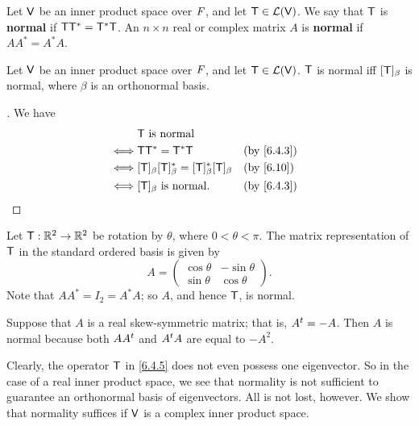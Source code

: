\begin{defn}\label{6.4.3}
	Let \(\mathsf{V}\) be an inner product space over \(\mathit{F}\), and let \(\mathsf{T} \in \mathcal{L}(\mathsf{V})\).
	We say that \(\mathsf{T}\) is \textbf{normal} if \(\mathsf{T} \mathsf{T}^* = \mathsf{T}^* \mathsf{T}\).
	An \(n \times n\) real or complex matrix \(A\) is \textbf{normal} if \(A A^* = A^* A\).
\end{defn}

\begin{cor}\label{6.4.4}
	Let \(\mathsf{V}\) be an inner product space over \(\mathit{F}\), and let \(\mathsf{T} \in \mathcal{L}(\mathsf{V})\).
	\(\mathsf{T}\) is normal iff \([\mathsf{T}]_{\beta}\) is normal, where \(\beta\) is an orthonormal basis.
\end{cor}

\begin{proof}[]
	We have
	\begin{align*}
		     & \T \text{ is normal}                                                      \\
		\iff & \T \T^* = \T^* \T                                         &  & \by{6.4.3} \\
		\iff & [\T]_{\beta} [\T]_{\beta}^* = [\T]_{\beta}^* [\T]_{\beta} &  & \by{6.10}  \\
		\iff & [\T]_{\beta} \text{ is normal}.                           &  & \by{6.4.3}
	\end{align*}
\end{proof}

\begin{eg}\label{6.4.5}
	Let \(\mathsf{T} : \mathbb{R}^2 \to \mathbb{R}^2\) be rotation by \(\theta\), where \(0 < \theta < \pi\).
	The matrix representation of \(\mathsf{T}\) in the standard ordered basis is given by
	\[
		A = \begin{pmatrix}
			\cos\theta & -\sin\theta \\
			\sin\theta & \cos\theta
		\end{pmatrix}.
	\]
	Note that \(A A^* = I_2 = A^* A\);
	so \(A\), and hence \(\mathsf{T}\), is normal.
\end{eg}

\begin{eg}\label{6.4.6}
	Suppose that \(A\) is a real skew-symmetric matrix;
	that is, \({A}^{t} = -A\).
	Then \(A\) is normal because both \(A {A}^{t}\) and \({A}^{t} A\) are equal to \(-A^2\).
\end{eg}

\begin{note}
	Clearly, the operator \(\mathsf{T}\) in \cref{6.4.5} does not even possess one eigenvector.
	So in the case of a real inner product space, we see that normality is not sufficient to guarantee an orthonormal basis of eigenvectors.
	All is not lost, however.
	We show that normality suffices if \(\mathsf{V}\) is a complex inner product space.
\end{note}

